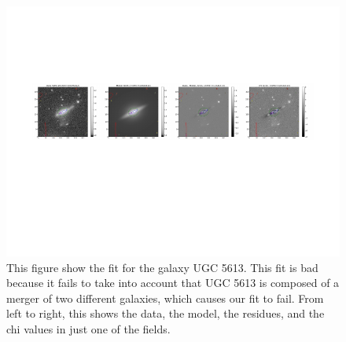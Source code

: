 \documentclass[12pt,preprint,pdftex]{aastex}
\begin{document}
\begin{figure}
\centering
\includegraphics[trim = .9cm 4.5cm 1.15cm 2.9cm,clip=true,width=\textwidth]{badsingle.pdf}
\caption{This figure show the fit for the galaxy UGC 5613. This fit is
 bad because it fails to take into account that UGC 5613 is composed
 of a merger of two different galaxies, which causes our fit to
 fail. From left to right, this shows the data, the model, the
 residues, and the chi values in just one of the fields.}
\label{fig:badsingle}
\end{figure}

\clearpage
\end{document}
